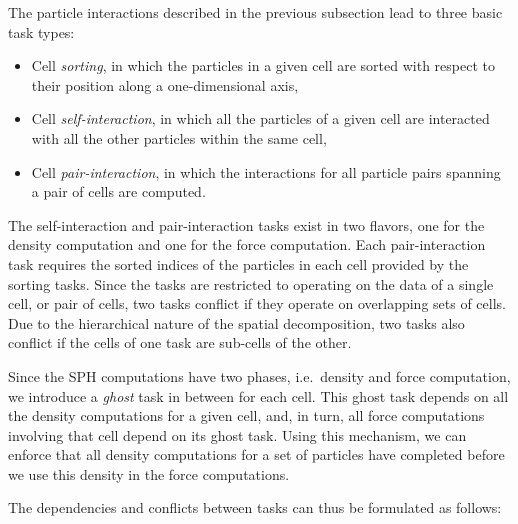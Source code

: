 \documentclass[a4paper,conference]{IEEEtran}
\begin{document}
The particle interactions described in the previous subsection
lead to three basic task types:
%
\begin{itemize}
    \item Cell {\em sorting}, in which the particles in a given
        cell are sorted with respect to their position along a
        one-dimensional axis,
    \item Cell {\em self-interaction}, in which all the particles
        of a given cell are interacted with all the other particles
        within the same cell,
    \item Cell {\em pair-interaction}, in which the interactions for
        all particle pairs spanning a pair of cells are computed. 
\end{itemize}
%
The self-interaction and pair-interaction tasks exist in
two flavors, one for the density computation
and one for the force computation.
Each pair-interaction task requires the sorted indices of
the particles in each cell provided by the sorting tasks.
Since the tasks are restricted to operating on the data of a
single cell, or pair of cells, two tasks conflict if they
operate on overlapping sets of cells.
Due to the hierarchical nature of the spatial decomposition,
two tasks also conflict if the cells of one task are sub-cells
of the other.

Since the SPH computations have two phases, i.e.~density and force
computation, we introduce a {\em ghost} task in between for each cell.
This ghost task depends on all the density computations
for a given cell, and, in turn, all force computations involving
that cell depend on its ghost task.
Using this mechanism, we can enforce that all density computations
for a set of particles have completed before we use this
density in the force computations.

The dependencies and conflicts between tasks can thus be
formulated as follows:
\end{document}
